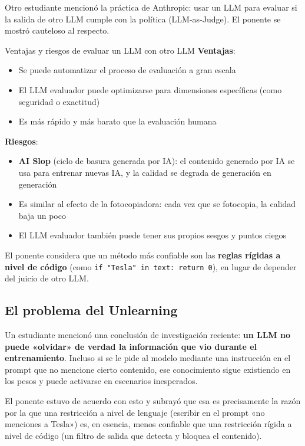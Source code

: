 Otro estudiante mencionó la práctica de Anthropic: usar un LLM para evaluar si la salida de otro LLM cumple con la política (LLM-as-Judge). El ponente se mostró cauteloso al respecto.

\begin{knowledgebox}{Ventajas y riesgos de evaluar un LLM con otro LLM}
\textbf{Ventajas}:
\begin{itemize}
    \item Se puede automatizar el proceso de evaluación a gran escala
    \item El LLM evaluador puede optimizarse para dimensiones específicas (como seguridad o exactitud)
    \item Es más rápido y más barato que la evaluación humana
\end{itemize}
\textbf{Riesgos}:
\begin{itemize}
    \item \textbf{AI Slop} (ciclo de basura generada por IA): el contenido generado por IA se usa para entrenar nuevas IA, y la calidad se degrada de generación en generación
    \item Es similar al efecto de la fotocopiadora: cada vez que se fotocopia, la calidad baja un poco
    \item El LLM evaluador también puede tener sus propios sesgos y puntos ciegos
\end{itemize}
El ponente considera que un método más confiable son las \textbf{reglas rígidas a nivel de código} (como \texttt{if "Tesla" in text: return 0}), en lugar de depender del juicio de otro LLM.
\end{knowledgebox}

\subsection{El problema del Unlearning}

Un estudiante mencionó una conclusión de investigación reciente: \textbf{un LLM no puede «olvidar» de verdad la información que vio durante el entrenamiento}. Incluso si se le pide al modelo mediante una instrucción en el prompt que no mencione cierto contenido, ese conocimiento sigue existiendo en los pesos y puede activarse en escenarios inesperados.

El ponente estuvo de acuerdo con esto y subrayó que esa es precisamente la razón por la que una restricción a nivel de lenguaje (escribir en el prompt «no menciones a Tesla») es, en esencia, menos confiable que una restricción rígida a nivel de código (un filtro de salida que detecta y bloquea el contenido).

